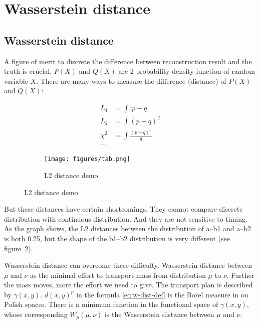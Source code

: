 \section{Wasserstein distance} %
\subsection{Wasserstein distance}
A figure of merit to discrete the difference between reconstruction result and the truth is crucial. $P(X)$ and $Q(X)$ are 2 probability density function of random variable $X$. There are many ways to measure the difference (distance) of $P(X)$ and $Q(X)$: 

\begin{figure}[H]
\begin{minipage}{.5\textwidth}
\begin{align*}
    L_{1} &= \int|p-q| \\
    L_{2} &= \int(p-q)^{2} \\
    \chi^{2} &= \int\frac{(p-q)^{2}}{q} \\
    \cdots
\end{align*}
\end{minipage}
\begin{minipage}{.5\textwidth}
\begin{figure}[H]
    \centering
    \texttt{[image: figures/tab.png]}
    \caption{\label{fig:l2} L2 distance demo}
\end{figure}
\end{minipage}
\end{figure}

But these distances have certain shortcomings. They cannot compare discrete distribution with continuous distribution. And they are not sensitive to timing. As the graph shows, the L2 distances between the distribution of a--b1 and a--b2 is both 0.25, but the shape of the b1--b2 distribution is very different (see figure~\ref{fig:l2}). 

Wasserstein distance can overcome these difficulty. Wasserstein distance between $\mu$ and $\nu$ as the minimal effort to transport mass from distribution $\mu$ to $\nu$. Further the mass moves, more the effort we need to give. The transport plan is described by $\gamma(x, y)$. $d(x,y)^{p}$ in the formula \eqref{eq:w-dist-def} is the Borel measure in
on Polish spaces. There is a minimum function in the functional space of $\gamma(x, y)$, whose corresponding $W_{p}(\mu ,\nu)$ is the Wasserstein distance between $\mu$ and $\nu$. 

